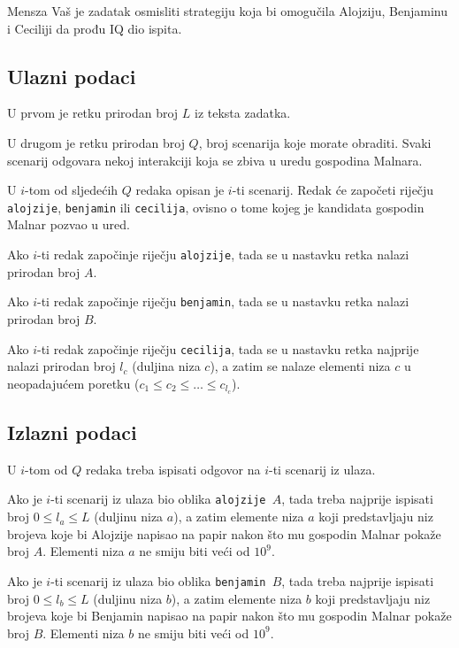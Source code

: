 \begin{statement}[
  problempoints=100,
  timelimit=1 sekunda,
  memorylimit=512 MiB,
]{Mensza}
Vaš je zadatak osmisliti strategiju koja bi omogučila Alojziju, Benjaminu i
Ceciliji da prođu IQ dio ispita.

\subsection*{Ulazni podaci}
U prvom je retku prirodan broj $L$ iz teksta zadatka.

U drugom je retku prirodan broj $Q$, broj scenarija koje morate obraditi. Svaki
scenarij odgovara nekoj interakciji koja se zbiva u uredu gospodina Malnara.

U $i$-tom od sljedećih $Q$ redaka opisan je $i$-ti scenarij. Redak će započeti
riječju \texttt{alojzije}, \texttt{benjamin} ili \texttt{cecilija}, ovisno o
tome kojeg je kandidata gospodin Malnar pozvao u ured.

Ako $i$-ti redak započinje riječju \texttt{alojzije}, tada se u nastavku retka
nalazi prirodan broj $A$.

Ako $i$-ti redak započinje riječju \texttt{benjamin}, tada se u nastavku retka
nalazi prirodan broj $B$.

Ako $i$-ti redak započinje riječju \texttt{cecilija}, tada se u nastavku retka
najprije nalazi prirodan broj $l_c$ (duljina niza $c$), a zatim se nalaze
elementi niza $c$ u neopadajućem poretku ($c_1 \le c_2 \le \ldots \le c_{l_c}$).

\subsection*{Izlazni podaci}
U $i$-tom od $Q$ redaka treba ispisati odgovor na $i$-ti scenarij iz ulaza.

Ako je $i$-ti scenarij iz ulaza bio oblika \texttt{alojzije $A$}, tada treba
najprije ispisati broj $0 \le l_a \le L$ (duljinu niza $a$), a zatim elemente niza
$a$ koji predstavljaju niz brojeva koje bi Alojzije napisao na papir nakon što
mu gospodin Malnar pokaže broj $A$. Elementi niza $a$ ne smiju biti veći od
$10^9$.

Ako je $i$-ti scenarij iz ulaza bio oblika \texttt{benjamin $B$}, tada treba
najprije ispisati broj $0 \le l_b \le L$ (duljinu niza $b$), a zatim elemente niza $b$ koji
predstavljaju niz brojeva koje bi Benjamin napisao na papir nakon što mu gospodin
Malnar pokaže broj $B$. Elementi niza $b$ ne smiju biti veći od $10^9$.


\end{statement}
